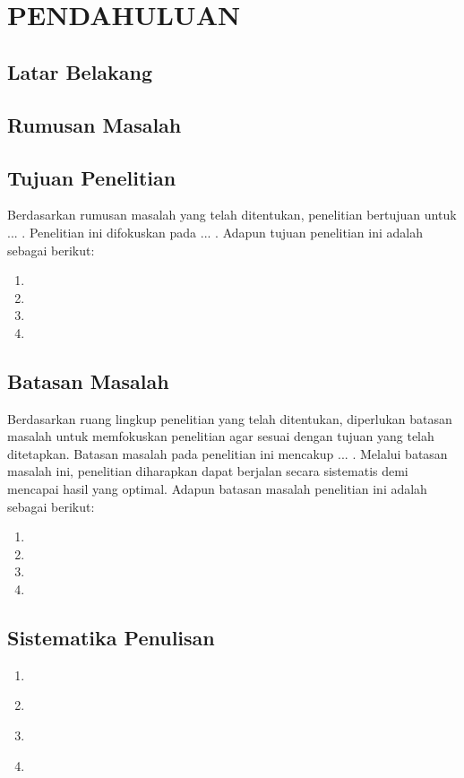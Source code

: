 \chapter[PENDAHULUAN]{\\ PENDAHULUAN}

\section{Latar Belakang}
\lipsum[2]

\section{Rumusan Masalah}
\lipsum[2]

\section{Tujuan Penelitian}

Berdasarkan rumusan masalah yang telah ditentukan, penelitian bertujuan untuk ... . Penelitian ini difokuskan pada ... . Adapun tujuan penelitian ini adalah sebagai berikut:

\begin{enumerate}
    \item \lipsum[2][5]
    \item \lipsum[2][5]
    \item \lipsum[2][5]
    \item \lipsum[2][5]
\end{enumerate}

\section{Batasan Masalah}

Berdasarkan ruang lingkup penelitian yang telah ditentukan, diperlukan batasan masalah untuk memfokuskan penelitian agar sesuai dengan tujuan yang telah ditetapkan. Batasan masalah pada penelitian ini mencakup ... . Melalui batasan masalah ini, penelitian diharapkan dapat berjalan secara sistematis demi mencapai hasil yang optimal. Adapun batasan masalah penelitian ini adalah sebagai berikut:

\begin{enumerate}
    \item \lipsum[2][5]
    \item \lipsum[2][5]
    \item \lipsum[2][5]
    \item \lipsum[2][5]
\end{enumerate}

\section{Sistematika Penulisan}
\lipsum[2]

\begin{enumerate}
    \item \lipsum[2][5] \\ \lipsum[2]
    \item \lipsum[2][5] \\ \lipsum[2]
    \item \lipsum[2][5] \\ \lipsum[2]
    \item \lipsum[2][5] \\ \lipsum[2]
\end{enumerate}
